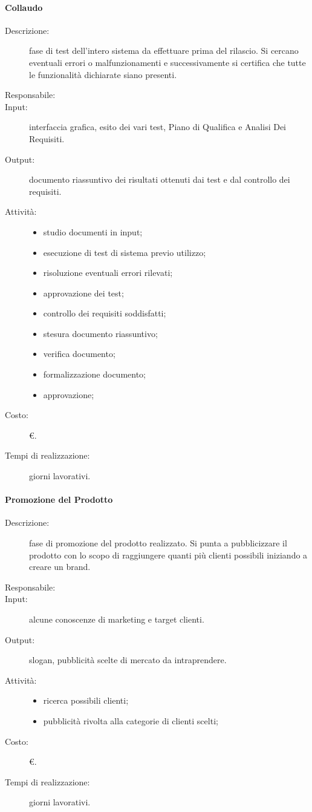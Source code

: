 \paragraph{Collaudo}
\begin{description}
\item[Descrizione:] fase di test dell'intero sistema da effettuare prima del rilascio. Si cercano eventuali errori o malfunzionamenti e successivamente si certifica che tutte le funzionalità dichiarate siano presenti.
\item[Responsabile:] 
\item[Input:] interfaccia grafica, esito dei vari test, Piano di Qualifica e Analisi Dei Requisiti.
\item[Output:] documento riassuntivo dei risultati ottenuti dai test e dal controllo dei requisiti.
\item[Attività:]
\begin{itemize}
\item studio documenti in input;
\item esecuzione di test di sistema previo utilizzo;
\item risoluzione eventuali errori rilevati;
\item approvazione dei test;
\item controllo dei requisiti soddisfatti;
\item stesura documento riassuntivo;
\item verifica documento;
\item formalizzazione documento;
\item approvazione;
\end{itemize}
\item[Costo:] \euro{}.
\item[Tempi di realizzazione:]  giorni lavorativi.
\end{description}

\paragraph{Promozione del Prodotto}
\begin{description}
\item[Descrizione:] fase di promozione del prodotto realizzato. Si punta a pubblicizzare il prodotto con lo scopo di raggiungere quanti più clienti possibili iniziando a creare un brand.
\item[Responsabile:] 
\item[Input:] alcune conoscenze di marketing e target clienti.
\item[Output:] slogan, pubblicità scelte di mercato da intraprendere.
\item[Attività:]
\begin{itemize}
\item ricerca possibili clienti;
\item pubblicità rivolta alla categorie di clienti scelti;
\end{itemize}
\item[Costo:] \euro{}.
\item[Tempi di realizzazione:]  giorni lavorativi.
\end{description}